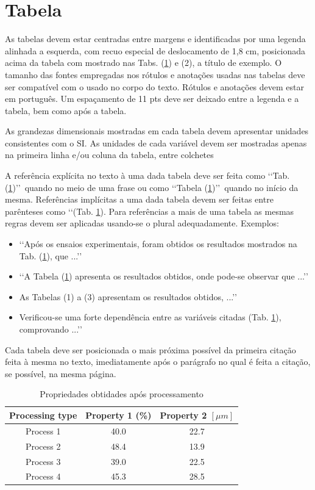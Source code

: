 \section{Tabela}

As tabelas devem estar centradas entre margens e identificadas por uma legenda
alinhada a esquerda, com recuo especial de deslocamento de 1,8 cm, posicionada
acima da tabela com mostrado nas Tabs. (\ref{tab01}) e (2), a título de
exemplo. O tamanho das fontes empregadas nos rótulos e anotações usadas nas
tabelas deve ser compatível com o usado no corpo do texto. Rótulos e anotações
devem estar em português. Um espaçamento de 11 pts deve ser deixado entre a
legenda e a tabela, bem como após a tabela.

As grandezas dimensionais mostradas em cada tabela devem apresentar unidades
consistentes com o SI. As unidades de cada variável devem ser mostradas apenas
na primeira linha e/ou coluna da tabela, entre colchetes

A referência explícita no texto à uma dada tabela deve ser feita como
\lq\lq Tab. (\ref{tab01})\rq\rq\ quando no meio de uma frase ou como
\lq\lq Tabela (\ref{tab01})\rq\rq\ quando no início da mesma. Referências
implícitas a uma dada tabela devem ser feitas entre parênteses como
\lq\lq (Tab. \ref{tab01}). Para referências a mais de uma tabela as mesmas
regras devem ser aplicadas usando-se o plural adequadamente. Exemplos:
\begin{itemize}
	\item \lq\lq Após os ensaios experimentais, foram obtidos os resultados
	mostrados na Tab. (\ref{tab01}), que ...\rq\rq
	\item \lq\lq A Tabela (\ref{tab01}) apresenta os resultados obtidos, onde
	pode-se observar que ...\rq\rq
	\item As Tabelas (1) a (3) apresentam os resultados obtidos, ...\rq\rq
	\item Verificou-se uma forte dependência entre as variáveis citadas
	(Tab. \ref{tab01}), comprovando ...\rq\rq
\end{itemize}

Cada tabela deve ser posicionada o mais próxima possível da primeira citação
feita à mesma no texto, imediatamente após o parágrafo no qual é feita a
citação, se possível, na mesma página.

\begin{table}[h]
	\centering
	\label{tab01}

	\begin{tabular}{ccc}
		\toprule
		\textbf{Processing type} & \textbf{Property 1} (\%) &
		\textbf{Property 2} $[\mu m]$ \\
		\midrule
		Process 1 & 40.0 & 22.7 \\
		Process 2 & 48.4 & 13.9 \\
		Process 3 & 39.0 & 22.5 \\
		Process 4 & 45.3 & 28.5 \\
		\bottomrule
	\end{tabular}

	\caption{Propriedades obtidades após processamento}
\end{table}

